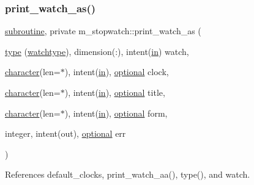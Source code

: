 \subsubsection{\texorpdfstring{print\+\_\+watch\+\_\+as()}{print\_watch\_as()}}
{\footnotesize\ttfamily \hyperlink{M__stopwatch_83_8txt_acfbcff50169d691ff02d4a123ed70482}{subroutine}, private m\+\_\+stopwatch\+::print\+\_\+watch\+\_\+as (\begin{DoxyParamCaption}\item[{\hyperlink{stop__watch_83_8txt_a70f0ead91c32e25323c03265aa302c1c}{type} (\hyperlink{structm__stopwatch_1_1watchtype}{watchtype}), dimension(\+:), intent(\hyperlink{M__journal_83_8txt_afce72651d1eed785a2132bee863b2f38}{in})}]{watch,  }\item[{\hyperlink{option__stopwatch_83_8txt_abd4b21fbbd175834027b5224bfe97e66}{character}(len=$\ast$), intent(\hyperlink{M__journal_83_8txt_afce72651d1eed785a2132bee863b2f38}{in}), \hyperlink{option__stopwatch_83_8txt_aa4ece75e7acf58a4843f70fe18c3ade5}{optional}}]{clock,  }\item[{\hyperlink{option__stopwatch_83_8txt_abd4b21fbbd175834027b5224bfe97e66}{character}(len=$\ast$), intent(\hyperlink{M__journal_83_8txt_afce72651d1eed785a2132bee863b2f38}{in}), \hyperlink{option__stopwatch_83_8txt_aa4ece75e7acf58a4843f70fe18c3ade5}{optional}}]{title,  }\item[{\hyperlink{option__stopwatch_83_8txt_abd4b21fbbd175834027b5224bfe97e66}{character}(len=$\ast$), intent(\hyperlink{M__journal_83_8txt_afce72651d1eed785a2132bee863b2f38}{in}), \hyperlink{option__stopwatch_83_8txt_aa4ece75e7acf58a4843f70fe18c3ade5}{optional}}]{form,  }\item[{integer, intent(out), \hyperlink{option__stopwatch_83_8txt_aa4ece75e7acf58a4843f70fe18c3ade5}{optional}}]{err }\end{DoxyParamCaption})\hspace{0.3cm}{\ttfamily [private]}}



References default\+\_\+clocks, print\+\_\+watch\+\_\+aa(), type(), and watch.

\mbox{\label{namespacem__stopwatch_a25075198a53d5b347cd1874e79f38bbb}} 
